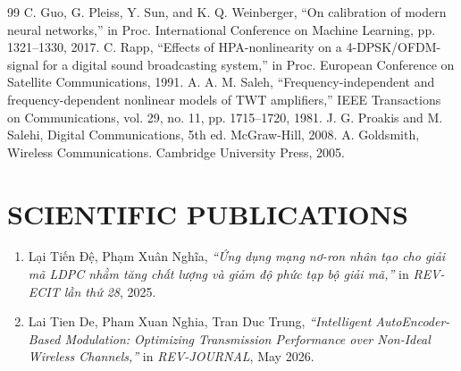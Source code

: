 \begin{thebibliography}{99}
 C. Guo, G. Pleiss, Y. Sun, and K. Q. Weinberger, ``On calibration of modern neural networks,'' in Proc. International Conference on Machine Learning, pp. 1321--1330, 2017.
 C. Rapp, ``Effects of HPA-nonlinearity on a 4-DPSK/OFDM-signal for a digital sound broadcasting system,'' in Proc. European Conference on Satellite Communications, 1991.
 A. A. M. Saleh, ``Frequency-independent and frequency-dependent nonlinear models of TWT amplifiers,'' IEEE Transactions on Communications, vol. 29, no. 11, pp. 1715--1720, 1981.
 J. G. Proakis and M. Salehi, Digital Communications, 5th ed. McGraw-Hill, 2008.
 A. Goldsmith, Wireless Communications. Cambridge University Press, 2005.
\end{thebibliography}
\appendix
\chapter*{SCIENTIFIC PUBLICATIONS}

\begin{enumerate}[label=\arabic*., leftmargin=1.2cm, itemsep=0.35cm]
\item Lại Tiến Đệ, Phạm Xuân Nghĩa, \textit{``Ứng dụng mạng nơ-ron nhân tạo cho giải mã LDPC nhằm tăng chất lượng và giảm độ phức tạp bộ giải mã,''} in \textit{REV-ECIT lần thứ 28}, 2025.

\item Lai Tien De, Pham Xuan Nghia, Tran Duc Trung, \textit{``Intelligent AutoEncoder-Based Modulation: Optimizing Transmission Performance over Non-Ideal Wireless Channels,''} in \textit{REV-JOURNAL}, May 2026.
\end{enumerate}
